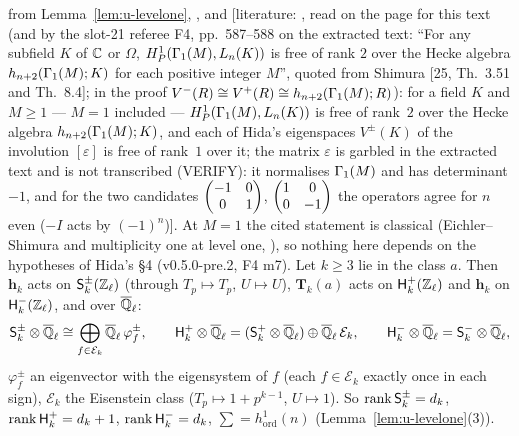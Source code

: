 \documentclass[11pt]{article}
\newcommand{\LIT}[1]{\textsf{[literature: #1]}}   %
\newcommand{\VERIFYloc}{\textsf{VERIFY}}          %
\newcommand{\hcusp}{\mathbf{h}}                   %
\newcommand{\Tu}{\mathbf{T}}                      %
\newcommand{\Ek}{\mathcal{E}}                     %
\newcommand{\Qlb}{\overline{\Q}_\ell}
\newcommand{\Zl}{\Z_\ell}
\begin{document}
\begin{lemma}\label{lem:u-msymsigns}
\PROVED{} from Lemma~\ref{lem:u-levelone}, ,  and \LIT{\cite[Lemma~6.4, pp.~587--588]{hida_invent}, read on the page for this text (and by the
slot-21 referee F4, pp.~587--588 on the extracted text: ``For any subfield $K$ of $\mathbb{C}$ or $\Omega$, $H^{1}_{P}(\Gamma_1(M),L_n(K))$ is free of rank $2$ over the Hecke algebra
$h_{n+2}(\Gamma_1(M);K)$ for each positive integer $M$'', quoted from Shimura [25, Th.~3.51 and Th.~8.4]; in the proof $V^{-}(R)\cong V^{+}(R)\cong h_{n+2}(\Gamma_1(M);R)$): for a
field $K$ and $M\ge1$ --- $M=1$ included --- $H^{1}_{P}(\Gamma_1(M),L_n(K))$ is free of rank~$2$ over the Hecke algebra $h_{n+2}(\Gamma_1(M);K)$, and each of Hida's eigenspaces $V^{\pm}(K)$ of the
involution $[\varepsilon]$ is free of rank~$1$ over it; the matrix $\varepsilon$ is garbled in the extracted text and is not transcribed (\VERIFYloc): it normalises $\Gamma_1(M)$ and has
determinant $-1$, and for the two candidates $\begin{pmatrix} -1 & 0 \\ 0 & 1 \end{pmatrix}$, $\begin{pmatrix} 1 & 0 \\ 0 & -1 \end{pmatrix}$ the operators agree for $n$ even ($-I$ acts by $(-1)^{n}$)}. At $M=1$ the cited statement is
classical (Eichler--Shimura and multiplicity one at level one, ), so nothing here depends on the hypotheses of Hida's \S4 (v0.5.0-pre.2, F4 m7). Let $k\ge3$ lie in the class $a$. Then $\hcusp_k$ acts on $\mathsf S^{\pm}_k(\Zl)$
(through $T_p\mapsto T_p$, $U\mapsto U$), $\Tu_k(a)$ acts on $\mathsf H^{+}_k(\Zl)$ and $\hcusp_k$ on $\mathsf H^{-}_k(\Zl)$, and over $\Qlb$:
\[
  \mathsf S^{\pm}_k\otimes\Qlb\cong\bigoplus_{f\in\Ek_k}\Qlb\,\varphi^{\pm}_f,\qquad \mathsf H^{+}_k\otimes\Qlb=(\mathsf S^{+}_k\otimes\Qlb)\oplus\Qlb\,\mathcal E_k,\qquad
  \mathsf H^{-}_k\otimes\Qlb=\mathsf S^{-}_k\otimes\Qlb,
\]
$\varphi^{\pm}_f$ an eigenvector with the eigensystem of $f$ (each $f\in\Ek_k$ exactly once in each sign), $\mathcal E_k$ the Eisenstein class ($T_p\mapsto1+p^{k-1}$, $U\mapsto1$).
So $\operatorname{rank}\mathsf S^{\pm}_k=d_k$, $\operatorname{rank}\mathsf H^{+}_k=d_k+1$, $\operatorname{rank}\mathsf H^{-}_k=d_k$, $\sum=h^{1}_{\mathrm{ord}}(n)$ (Lemma~\ref{lem:u-levelone}(3)).
\end{lemma}
\end{document}
